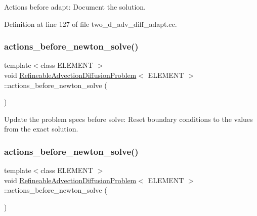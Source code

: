 Actions before adapt\+: Document the solution. 



Definition at line 127 of file two\+\_\+d\+\_\+adv\+\_\+diff\+\_\+adapt.\+cc.

\mbox{\label{classRefineableAdvectionDiffusionProblem_a7cbcaa45fd7e932f335cc07a83b4d3e2}} 
\subsubsection{\texorpdfstring{actions\+\_\+before\+\_\+newton\+\_\+solve()}{actions\_before\_newton\_solve()}\hspace{0.1cm}{\footnotesize\ttfamily [1/2]}}
{\footnotesize\ttfamily template$<$class E\+L\+E\+M\+E\+NT $>$ \\
void \hyperlink{classRefineableAdvectionDiffusionProblem}{Refineable\+Advection\+Diffusion\+Problem}$<$ E\+L\+E\+M\+E\+NT $>$\+::actions\+\_\+before\+\_\+newton\+\_\+solve (\begin{DoxyParamCaption}{ }\end{DoxyParamCaption})}



Update the problem specs before solve\+: Reset boundary conditions to the values from the exact solution. 

\mbox{\label{classRefineableAdvectionDiffusionProblem_a7cbcaa45fd7e932f335cc07a83b4d3e2}} 
\subsubsection{\texorpdfstring{actions\+\_\+before\+\_\+newton\+\_\+solve()}{actions\_before\_newton\_solve()}\hspace{0.1cm}{\footnotesize\ttfamily [2/2]}}
{\footnotesize\ttfamily template$<$class E\+L\+E\+M\+E\+NT $>$ \\
void \hyperlink{classRefineableAdvectionDiffusionProblem}{Refineable\+Advection\+Diffusion\+Problem}$<$ E\+L\+E\+M\+E\+NT $>$\+::actions\+\_\+before\+\_\+newton\+\_\+solve (\begin{DoxyParamCaption}{ }\end{DoxyParamCaption})}




